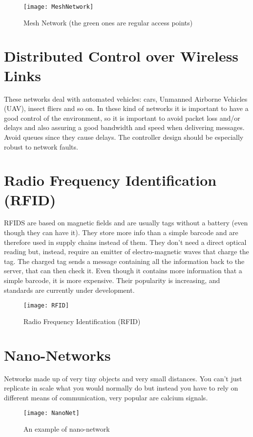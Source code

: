 \begin{figure}[!h]
  \centering
  \texttt{[image: MeshNetwork]}
  \caption[An example of a Mesh Network]{Mesh Network (the green ones are
   regular access points)}
  \label{fig:mn:MeshNetwork}
\end{figure}	

\section{Distributed Control over Wireless Links}
These networks deal with automated vehicles: cars, Unmanned Airborne 
Vehicles (UAV), insect fliers and so on.
In these kind of networks it is important to have a good control of the 
environment, so it is important to avoid packet loss and/or delays and also 
assuring a good bandwidth and speed when delivering messages. Avoid queues since 
they cause delays.
The controller design should be especially robust to network faults.

\section{Radio Frequency Identification (RFID)}
RFIDS are based on magnetic fields and are usually tags without a 
battery (even though they can have it). They store more info than a simple 
barcode and are therefore used in supply chains instead of them. They don't 
need a direct optical reading but, instead, require an emitter of 
electro-magnetic waves that charge the tag. The charged tag sends a message 
containing all the information back to the server, that can then check it.
Even though it contains more information that a simple barcode, it is 
more expensive. Their popularity is increasing, and standards are currently 
under development.

\begin{figure}[t]
  \centering
  \texttt{[image: RFID]}
  \caption{Radio Frequency Identification (RFID)}
  \label{fig:ewn:RFID}
\end{figure}

\section{Nano-Networks}
Networks made up of very tiny objects and very small distances. You 
can't just replicate in scale what you would normally do  but instead you have 
to rely on different means of communication, very popular are calcium signals.

\begin{figure}[t]
  \centering
  \texttt{[image: NanoNet]}
  \caption{An example of nano-network}				
  \label{fig:ewn:NanoNet}
\end{figure}


